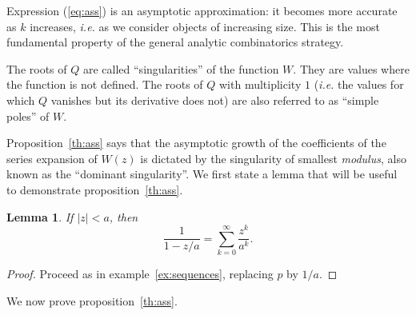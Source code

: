 \documentclass{article}
\newtheorem{lemma}{Lemma}
\begin{document}
Expression (\ref{eq:ass}) is an asymptotic approximation: it becomes more
accurate as $k$ increases, \textit{i.e.} as we consider objects of
increasing size. This is the most fundamental property of the general
analytic combinatorics strategy.

The roots of $Q$ are called ``singularities'' of the function $W$. They
are values where the function is not defined. The roots of $Q$ with
multiplicity $1$ (\textit{i.e.} the values for which $Q$ vanishes but its
derivative does not) are also referred to as ``simple poles'' of $W$.

Proposition~\ref{th:ass} says that the asymptotic growth of the
coefficients of the series expansion of $W(z)$ is dictated by the
singularity of smallest \textit{modulus}, also known as the ``dominant
singularity''. We first state a lemma that will be useful to demonstrate
proposition~\ref{th:ass}.

\begin{lemma}
\label{lemma:poles}
If $|z| < a$, then
\begin{equation}
\label{eq:poles}
\frac{1}{1-z/a} = \sum_{k=0}^\infty \frac{z^k}{a^k}.
\end{equation}
\end{lemma}

\begin{proof}
Proceed as in example~\ref{ex:sequences}, replacing $p$ by $1/a$.
\end{proof}

We now prove proposition~\ref{th:ass}.
\end{document}
